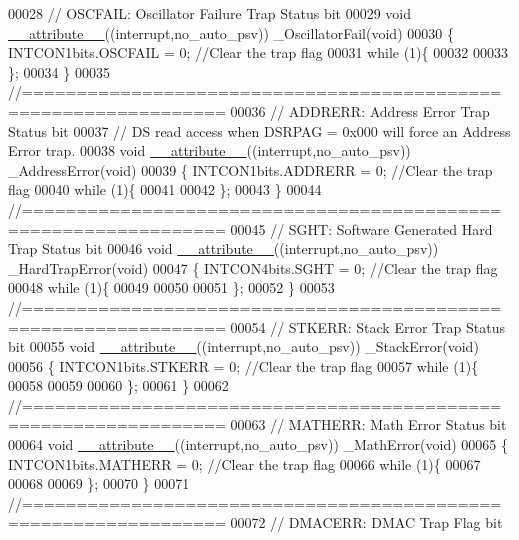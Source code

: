 \begin{DoxyCode}
00028 \textcolor{comment}{// OSCFAIL: Oscillator Failure Trap Status bit}
00029 \textcolor{keywordtype}{void} \hyperlink{a00070_a226557d5e42f7e29ddaff30606138459}{\_\_attribute\_\_}((interrupt,no\_auto\_psv)) \_OscillatorFail(\textcolor{keywordtype}{void})
00030 \{ INTCON1bits.OSCFAIL = 0; \textcolor{comment}{//Clear the trap flag}
00031 \textcolor{keywordflow}{while} (1)\{
00032     
00033 \};
00034 \}
00035 \textcolor{comment}{//================================================================}
00036 \textcolor{comment}{// ADDRERR: Address Error Trap Status bit}
00037 \textcolor{comment}{// DS read access when DSRPAG = 0x000 will force an Address Error trap.}
00038 \textcolor{keywordtype}{void} \hyperlink{a00070_a226557d5e42f7e29ddaff30606138459}{\_\_attribute\_\_}((interrupt,no\_auto\_psv)) \_AddressError(\textcolor{keywordtype}{void})
00039 \{ INTCON1bits.ADDRERR = 0; \textcolor{comment}{//Clear the trap flag}
00040 \textcolor{keywordflow}{while} (1)\{
00041     
00042 \};
00043 \}
00044 \textcolor{comment}{//================================================================}
00045 \textcolor{comment}{// SGHT: Software Generated Hard Trap Status bit}
00046 \textcolor{keywordtype}{void} \hyperlink{a00070_a226557d5e42f7e29ddaff30606138459}{\_\_attribute\_\_}((interrupt,no\_auto\_psv)) \_HardTrapError(\textcolor{keywordtype}{void})
00047 \{ INTCON4bits.SGHT = 0; \textcolor{comment}{//Clear the trap flag}
00048 \textcolor{keywordflow}{while} (1)\{
00049    
00050 
00051 \};
00052 \}
00053 \textcolor{comment}{//================================================================}
00054 \textcolor{comment}{// STKERR: Stack Error Trap Status bit}
00055 \textcolor{keywordtype}{void} \hyperlink{a00070_a226557d5e42f7e29ddaff30606138459}{\_\_attribute\_\_}((interrupt,no\_auto\_psv)) \_StackError(\textcolor{keywordtype}{void})
00056 \{ INTCON1bits.STKERR = 0; \textcolor{comment}{//Clear the trap flag}
00057 \textcolor{keywordflow}{while} (1)\{
00058     
00059 
00060 \};
00061 \}
00062 \textcolor{comment}{//================================================================}
00063 \textcolor{comment}{// MATHERR: Math Error Status bit}
00064 \textcolor{keywordtype}{void} \hyperlink{a00070_a226557d5e42f7e29ddaff30606138459}{\_\_attribute\_\_}((interrupt,no\_auto\_psv)) \_MathError(\textcolor{keywordtype}{void})
00065 \{ INTCON1bits.MATHERR = 0; \textcolor{comment}{//Clear the trap flag}
00066 \textcolor{keywordflow}{while} (1)\{
00067    
00068 
00069 \};
00070 \}
00071 \textcolor{comment}{//================================================================}
00072 \textcolor{comment}{// DMACERR: DMAC Trap Flag bit}

\end{DoxyCode}

